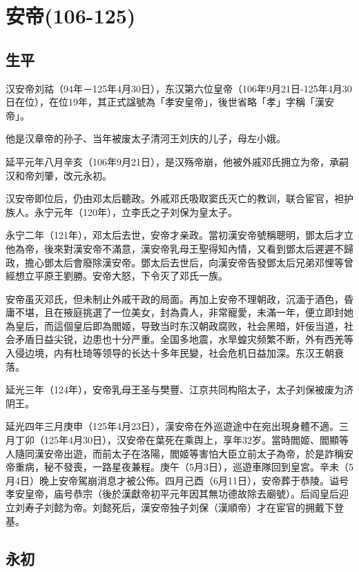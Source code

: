 
\section{安帝\tiny(106-125)}

\subsection{生平}

汉安帝刘祜（94年－125年4月30日），东汉第六位皇帝（106年9月21日-125年4月30日在位），在位19年，其正式諡號為「孝安皇帝」，後世省略「孝」字稱「漢安帝」。

他是汉章帝的孙子、当年被废太子清河王刘庆的儿子，母左小娥。

延平元年八月辛亥（106年9月21日），是汉殇帝崩，他被外戚邓氏拥立为帝，承嗣汉和帝刘肇，改元永初。

汉安帝即位后，仍由邓太后聽政。外戚邓氏吸取窦氏灭亡的教训，联合宦官，袒护族人。永宁元年（120年），立李氏之子刘保为皇太子。

永宁二年（121年），邓太后去世，安帝才亲政。當初漢安帝號稱聰明，鄧太后才立他為帝，後來對漢安帝不滿意，漢安帝乳母王聖得知內情，又看到鄧太后遲遲不歸政，擔心鄧太后會廢除漢安帝。鄧太后去世后，向漢安帝告發鄧太后兄弟邓悝等曾經想立平原王劉勝。安帝大怒，下令灭了邓氏一族。

安帝虽灭邓氏，但未制止外戚干政的局面。再加上安帝不理朝政，沉湎于酒色，昏庸不堪，且在掖庭挑選了一位美女，封為貴人，非常寵愛，未滿一年，便立即封她為皇后，而這個皇后即為閻姬，导致当时东汉朝政腐败，社会黑暗，奸佞当道，社会矛盾日益尖锐，边患也十分严重。全国多地震，水旱蝗灾频繁不断，外有西羌等入侵边境，内有杜琦等领导的长达十多年民變，社会危机日益加深。东汉王朝衰落。

延光三年（124年），安帝乳母王圣与樊豐、江京共同构陷太子，太子刘保被废为济阴王。

延光四年三月庚申（125年4月23日），漢安帝在外巡遊途中在宛出現身體不適。三月丁卯（125年4月30日），汉安帝在葉死在乘舆上，享年32岁。當時閻姬、閻顯等人隨同漢安帝出遊，而前太子在洛陽，閻姬等害怕大臣立前太子為帝，於是詐稱安帝重病，秘不發喪，一路星夜兼程。庚午（5月3日），巡遊車隊回到皇宮。辛未（5月4日）晚上安帝駕崩消息才被公佈。四月己酉（6月11日），安帝葬于恭陵。谥号孝安皇帝，庙号恭宗（後於漢獻帝初平元年因其無功德故除去廟號）。后阎皇后迎立刘寿子刘懿为帝。刘懿死后，漢安帝独子刘保（漢順帝）才在宦官的拥戴下登基。

\subsection{永初}

